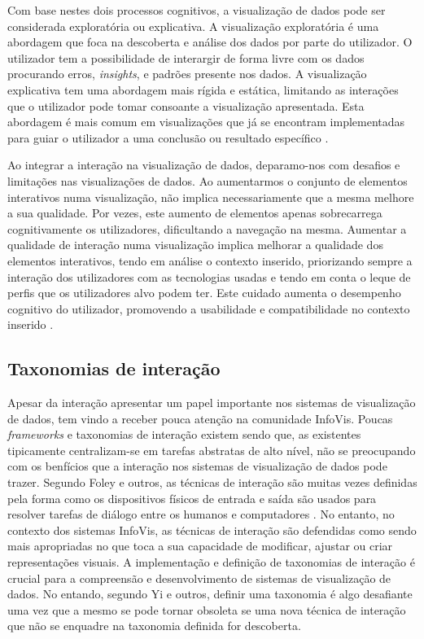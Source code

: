 Com base nestes dois processos cognitivos, a visualização de dados pode ser considerada exploratória ou explicativa. A visualização exploratória é uma abordagem que foca na descoberta e análise dos dados por parte do utilizador. O utilizador tem a possibilidade de interargir de forma livre com os dados procurando erros, \textit{insights}, e padrões presente nos dados. A visualização explicativa tem uma abordagem mais rígida e estática, limitando as interações que o utilizador pode tomar consoante a visualização apresentada. Esta abordagem é mais comum em visualizações que já se encontram implementadas para guiar o utilizador a uma conclusão ou resultado específico \cite{heer2012interactive}. 

Ao integrar a interação na visualização de dados, deparamo-nos com desafios e limitações nas visualizações de dados. Ao aumentarmos o conjunto de elementos interativos numa visualização, não implica necessariamente que a mesma melhore a sua qualidade. Por vezes, este aumento de elementos apenas sobrecarrega cognitivamente os utilizadores, dificultando a navegação na mesma. Aumentar a qualidade de interação numa visualização implica melhorar a qualidade dos elementos interativos, tendo em análise o contexto inserido, priorizando sempre a interação dos utilizadores com as tecnologias usadas e tendo em conta o leque de perfis que os utilizadores alvo podem ter. Este cuidado aumenta o desempenho cognitivo do utilizador, promovendo a usabilidade e compatibilidade no contexto inserido \cite{dimara2019interaction}. 

\subsection{Taxonomias de interação} %
\label{sub:taxonomias_interacao}

Apesar da interação apresentar um papel importante nos sistemas de visualização de dados, tem vindo a receber pouca atenção na comunidade \gls{InfoVis}. Poucas \textit{frameworks} e taxonomias de interação existem sendo que, as existentes tipicamente centralizam-se em tarefas abstratas de alto nível, não se preocupando com os benfícios que a interação nos sistemas de visualização de dados pode trazer. Segundo Foley e outros, as técnicas de interação são muitas vezes definidas pela forma como os dispositivos físicos de entrada e saída são usados para resolver tarefas de diálogo entre os humanos e computadores \cite{foley1996computer}. No entanto, no contexto dos sistemas \gls{InfoVis}, as técnicas de interação são defendidas como sendo mais apropriadas no que toca a sua capacidade de modificar, ajustar ou criar representações visuais. A implementação e definição de taxonomias de interação é crucial para a compreensão e desenvolvimento de sistemas de visualização de dados. No entando, segundo Yi e outros, definir uma taxonomia é algo desafiante uma vez que a mesmo se pode tornar obsoleta se uma nova técnica de interação que não se enquadre na taxonomia definida for descoberta.

